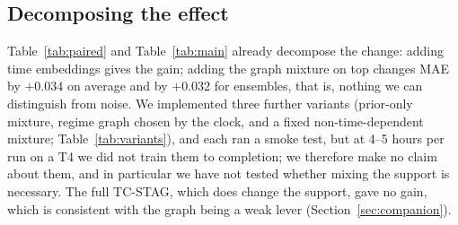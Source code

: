 \documentclass[conference]{IEEEtran}
\begin{document}
\subsection{Decomposing the effect}\label{sec:ablation}
Table~\ref{tab:paired} and Table~\ref{tab:main} already decompose the change: adding time embeddings gives the gain; adding the graph mixture on top changes MAE by $+0.034$ on average and by $+0.032$ for ensembles, that is, nothing we can distinguish from noise. We implemented three further variants (prior-only mixture, regime graph chosen by the clock, and a fixed non-time-dependent mixture; Table~\ref{tab:variants}), and each ran a smoke test, but at 4--5 hours per run on a T4 we did not train them to completion; we therefore make no claim about them, and in particular we have not tested whether mixing the support is necessary. The full TC-STAG, which does change the support, gave no gain, which is consistent with the graph being a weak lever (Section~\ref{sec:companion}).
\end{document}
